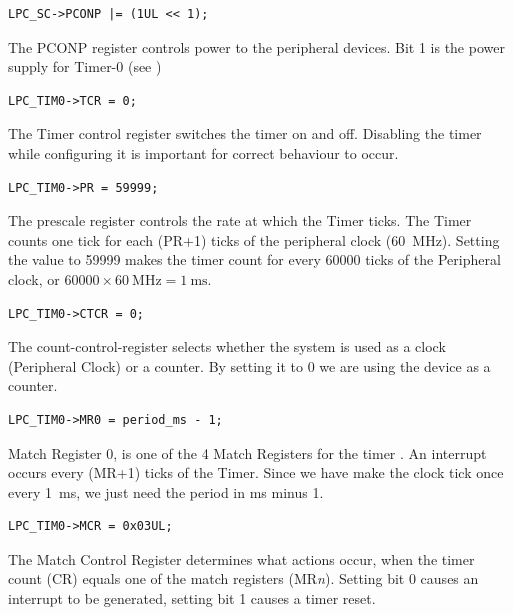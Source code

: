 \documentclass[a4paper]{tufte-handout}
\begin{document}
\begin{verbatim}
LPC_SC->PCONP |= (1UL << 1);
\end{verbatim}
The PCONP register controls power to the peripheral devices.  Bit 1 is
the power supply for Timer-0 (see \citep[Table 14, pg.30]{lpc4088})

\begin{verbatim}
LPC_TIM0->TCR = 0;
\end{verbatim}
The Timer control register \citep[24.6.2]{lpc4088} switches the timer
on and off.  Disabling the timer while configuring it is important for
correct behaviour to occur.

\begin{verbatim}
LPC_TIM0->PR = 59999;
\end{verbatim}
The prescale register \citep[24.6.4]{lpc4088} controls the rate at
which the Timer ticks.  The Timer counts one tick for each (PR+1)
ticks of the peripheral clock (\SI{60}{\mega\hertz}).  Setting the
value to 59999 makes the timer count for every 60000 ticks of the
Peripheral clock, or $60000\times\SI{60}{\mega\hertz} =
\SI{1}{\milli\second}$. 

\begin{verbatim}
LPC_TIM0->CTCR = 0;
\end{verbatim}
The count-control-register \citep[24.6.11]{lpc4088} selects whether the
system is used as a clock (Peripheral Clock) or a counter.  By setting
it to 0 we are using the device as a counter.

\begin{verbatim}
LPC_TIM0->MR0 = period_ms - 1;
\end{verbatim}
Match Register 0, is one of the 4 Match Registers for the timer
\citep[24.6.7]{lpc4088}.  An interrupt occurs every (MR+1) ticks of
the Timer.  Since we have make the clock tick once every
\SI{1}{\milli\second}, we just need the period in \si{\milli\second}
minus 1.

\begin{verbatim}
LPC_TIM0->MCR = 0x03UL;
\end{verbatim}
The Match Control Register \citep[24.6.6]{lpc4088} determines what
actions occur, when the timer count (CR) equals one of the match
registers (MR\textit{n}).  Setting bit 0 causes an interrupt to be
generated, setting bit 1 causes a timer reset.
\end{document}
